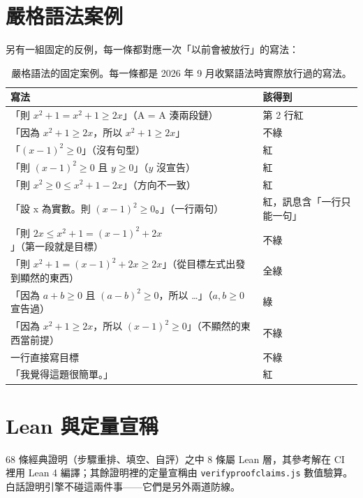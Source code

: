 \documentclass[11pt,a4paper,oneside]{book}
\renewcommand{\_}{\ifmmode\origunderscore\else\textunderscore\allowbreak\fi}
\newcommand{\file}[1]{\texttt{\small #1}}
\begin{document}
\section{嚴格語法案例}
另有一組固定的反例，每一條都對應一次「以前會被放行」的寫法：
\begin{table}[h]
\centering\small\sffamily
\begin{tabularx}{\textwidth}{@{}Yl@{}}
\toprule
寫法 & 該得到 \\
\midrule
「則 $x^2+1 = x^2+1 \ge 2x$」（A = A 湊兩段鏈） & 第 2 行紅 \\
「因為 $x^2+1 \ge 2x$，所以 $x^2+1 \ge 2x$」 & 不綠 \\
「$(x-1)^2 \ge 0$」（沒有句型） & 紅 \\
「則 $(x-1)^2 \ge 0$ 且 $y \ge 0$」（$y$ 沒宣告） & 紅 \\
「則 $x^2 \ge 0 \le x^2+1-2x$」（方向不一致） & 紅 \\
「設 x 為實數。則 $(x-1)^2 \ge 0$。」（一行兩句） & 紅，訊息含「一行只能一句」 \\
「則 $2x \le x^2+1 = (x-1)^2 + 2x$」（第一段就是目標） & 不綠 \\
「則 $x^2+1 = (x-1)^2 + 2x \ge 2x$」（從目標左式出發到顯然的東西） & 全綠 \\
「因為 $a+b \ge 0$ 且 $(a-b)^2 \ge 0$，所以 …」（$a,b \ge 0$ 宣告過） & 綠 \\
「因為 $x^2+1 \ge 2x$，所以 $(x-1)^2 \ge 0$」（不顯然的東西當前提） & 不綠 \\
一行直接寫目標 & 不綠 \\
「我覺得這題很簡單。」 & 紅 \\
\bottomrule
\end{tabularx}
\caption{嚴格語法的固定案例。每一條都是 2026 年 9 月收緊語法時實際放行過的寫法。}
\end{table}

\section{Lean 與定量宣稱}
68 條經典證明（步驟重排、填空、自評）之中 8 條屬 Lean 層，其參考解在 CI 裡用 Lean 4 編譯；其餘證明裡的定量宣稱由 \file{verify\_proof\_claims.js} 數值驗算。白話證明引擎不碰這兩件事——它們是另外兩道防線。
\end{document}
